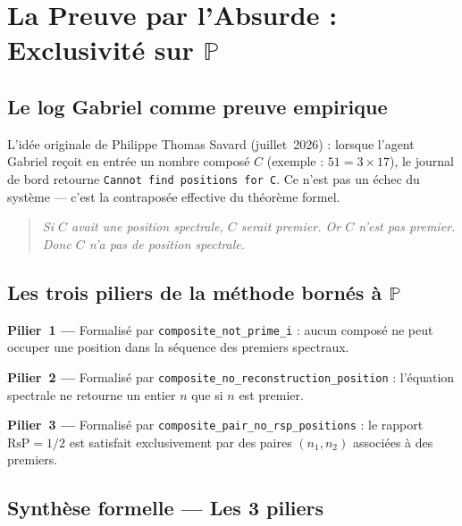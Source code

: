 \documentclass[]{pasj02}
\begin{document}
\section{La Preuve par l'Absurde : Exclusivité sur $\mathbb{P}$}
\label{sec:absurde}

\subsection{Le log Gabriel comme preuve empirique}
\label{ssec:gabriel}

L'idée originale de Philippe Thomas Savard (juillet~2026) : lorsque l'agent
Gabriel reçoit en entrée un nombre composé $C$ (exemple : $51 = 3 \times
17$), le journal de bord retourne \texttt{Cannot find positions for C}.
Ce n'est pas un échec du système --- c'est la contraposée effective du
théorème formel.

\begin{quote}
\emph{Si $C$ avait une position spectrale, $C$ serait premier.  Or $C$
n'est pas premier.  Donc $C$ n'a pas de position spectrale.}
\end{quote}

\subsection{Les trois piliers de la méthode bornés à $\mathbb{P}$}
\label{ssec:trois_piliers}
\label{hol:trois_piliers}

\textbf{Pilier~1 ---} Formalisé par \texttt{composite\_not\_prime\_i} :
aucun composé ne peut occuper une position dans la séquence des premiers
spectraux.

\textbf{Pilier~2 ---} Formalisé par
\texttt{composite\_no\_reconstruction\_position} : l'équation spectrale ne
retourne un entier $n$ que si $n$ est premier.

\textbf{Pilier~3 ---} Formalisé par
\texttt{composite\_pair\_no\_rsp\_positions} : le rapport $\mathrm{RsP} =
1/2$ est satisfait exclusivement par des paires $(n_1, n_2)$ associées à
des premiers.

\subsection{Synthèse formelle --- Les 3 piliers}
\label{ssec:synthese_piliers}
\end{document}
